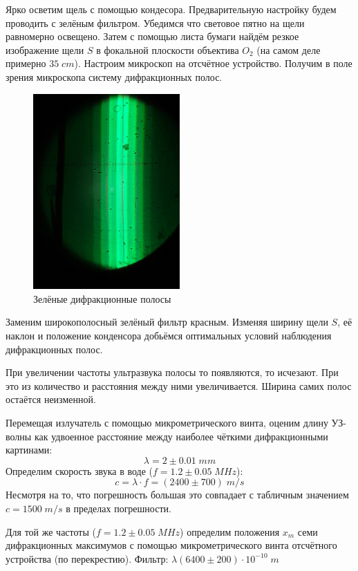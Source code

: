 \documentclass{article}
\begin{document}
Ярко осветим щель с помощью кондесора. Предварительную настройку будем проводить с зелёным фильтром.
Убедимся что световое пятно на щели равномерно освещено. Затем с помощью листа бумаги найдём резкое
изображение щели \(S\) в фокальной плоскости объектива \(O_2\) (на самом деле примерно \(35\; cm\)).
Настроим микроскоп на отсчётное устройство. Получим в поле зрения микроскопа систему дифракционных
полос.
\begin{figure}[H]
  \centering
  \includegraphics[width=0.5\textwidth]{green-lines.jpg}
  \caption{Зелёные дифракционные полосы}
  \label{fig:green-lines}
\end{figure}

Заменим широкополосный зелёный фильтр красным. Изменяя ширину щели \(S\), её наклон и положение конденсора
добьёмся оптимальных условий наблюдения дифракционных полос. 

При увеличении частоты ультразвука полосы то появляются, то исчезают. При это из количество и расстояния 
между ними увеличивается. Ширина самих полос остаётся неизменной.

Перемещая излучатель с помощью микрометрического винта, оценим длину УЗ-волны как удвоенное расстояние
между наиболее чёткими дифракционными картинами:
\[ \lambda = 2 \pm 0.01\; mm \]
Определим скорость звука в воде (\(f = 1.2 \pm 0.05\; MHz\)):
\[ c = \lambda \cdot f = (2400 \pm 700)\; m/s\] Несмотря на то, что погрешность большая это совпадает с табличным
значением \(c = 1500\; m/s \) в пределах погрешности.

Для той же частоты (\(f = 1.2 \pm 0.05\; MHz\)) определим положения \(x_m\) семи дифракционных максимумов
с помощью микрометрического винта отсчётного устройства (по перекрестию).
Фильтр: \(\lambda  (6400 \pm 200) \cdot 10^{-10}\; m\)
\end{document}
